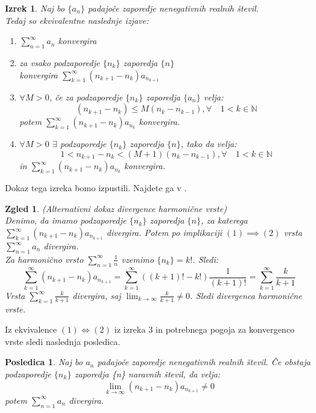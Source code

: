 \documentclass[a4paper,12pt]{article}
\def\N{\mathbb{N}} %
\newtheorem{izrek}{Izrek}
\newtheorem{posledica}{Posledica}
\newtheorem{zgled}{Zgled}
\begin{document}
\begin{izrek}
    Naj bo $\{a_n\}$ padajoče zaporedje nenegativnih realnih števil. \\
    
    Tedaj so ekvivalentne naslednje izjave:
    \begin{enumerate}
        \item $\sum_{n = 1}^{\infty}{a_n}$ konvergira
        \item za vsako podzaporedje $\{n_k\}$ zaporedja $\{n\}$ \\
        konvergira $\sum_{k = 1}^{\infty}{(n_{k+1} - n_k)a_{n_{k + 1}}}$
        \item $\forall M > 0$, če za podzaporedje $\{n_k\}$ zaporedja $\{a_n\}$ velja:
        \[
            (n_{k+1} - n_k) \leq M(n_k - n_{k - 1}),  \forall \quad 1 < k \in \N 
        \]
        potem $\sum_{k = 1}^{\infty}{(n_{k+1} - n_k)a_{n_{k}}}$ konvergira.
        \item $\forall M > 0$ $\exists$ podzaporedje $\{n_k\}$ zaporedja $\{n\}$, tako da velja:
        \[
            1 < n_{k+1} - n_k < (M+1)(n_k - n_{k - 1}),  \forall \quad 1 < k \in \N 
        \]
        in $\sum_{k = 1}^{\infty}{(n_{k+1} - n_k)a_{n_{k}}}$ konvergira.
    \end{enumerate}
\end{izrek}

\noindent
Dokaz tega izreka bomo izpustili. Najdete ga v \cite{convergence}.

\begin{zgled}(Alternativni dokaz divergence harmonične vrste)\\
    Denimo, da imamo podzaporedje $\{n_k\}$ zaporedja $\{n\}$, 
    za katerega $\sum_{k = 1}^{\infty}{(n_{k+1} - n_k)a_{n_{k + 1}}}$ divergira. Potem po implikaciji
    $ (1) \implies (2)$ vrsta $\sum_{n = 1}^{\infty}{a_n}$ divergira.\\
    Za harmonično vrsto $\sum_{n = 1}^{\infty}{\frac{1}{n}}$ vzemimo $\{n_k\} = k!$. Sledi:
    \[
        \sum_{k = 1}^{\infty}{(n_{k+1} - n_k)a_{n_{k + 1}}} =
        \sum_{k = 1}^{\infty}{((k + 1)! - k!) \frac{1}{(k+1)!}}=
        \sum_{k = 1}^{\infty}{\frac{k}{k + 1}}
    \]
    Vrsta $\sum_{k = 1}^{\infty}{\frac{k}{k + 1}}$ divergira,
    saj $\lim_{k \to \infty}{\frac{k}{k + 1}} \neq 0$. Sledi divergenca harmonične vrste.
\end{zgled}


Iz ekvivalence $(1) \iff (2)$ iz izreka 3 in potrebnega pogoja za konvergenco vrste sledi naslednja posledica.
\begin{posledica}
    Naj bo ${a_n}$ padajoče zaporedje nenegativnih realnih števil.
    Če obstaja podzaporedje $\{n_k\}$ zaporedja \{n\} naravnih števil, da velja:
    \[
        \lim_{k \to \infty} (n_{k+1} - n_k)a_{n_{k+1}} \neq 0 
    \] 
    potem $\sum_{n = 1}^{\infty}{a_n}$ divergira.
\end{posledica}
\end{document}
